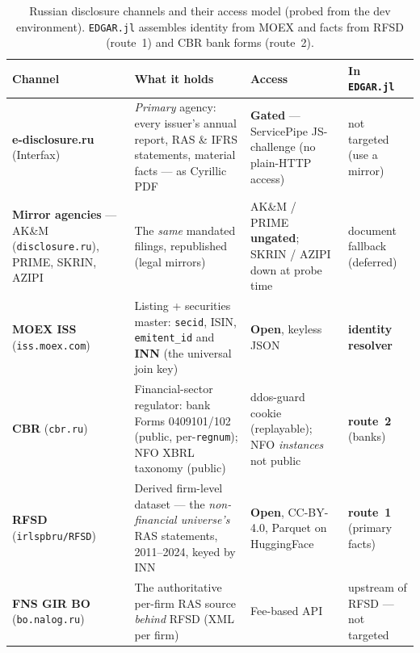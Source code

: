 \documentclass[11pt,a4paper]{report}
\begin{document}
\begin{table}[h]
\centering
\small
\caption{Russian disclosure channels and their access model (probed from the dev environment). \texttt{EDGAR.jl}
assembles identity from MOEX and facts from RFSD (route~1) and CBR bank forms (route~2).}
\label{tab:russia-repos}
\begin{tabular}{@{}p{}p{}p{}p{}@{}}
\toprule
\textbf{Channel} & \textbf{What it holds} & \textbf{Access} & \textbf{In \texttt{EDGAR.jl}} \\
\midrule
\textbf{e-disclosure.ru} (Interfax) & \emph{Primary} agency: every issuer's annual report, RAS \& IFRS
  statements, material facts --- as Cyrillic PDF & \textbf{Gated} --- ServicePipe JS-challenge (no plain-HTTP
  access) & not targeted (use a mirror) \\
\textbf{Mirror agencies} --- AK\&M (\texttt{disclosure.ru}), PRIME, SKRIN, AZIPI & The \emph{same} mandated
  filings, republished (legal mirrors) & AK\&M / PRIME \textbf{ungated}; SKRIN / AZIPI down at probe time &
  document fallback (deferred) \\
\textbf{MOEX ISS} (\texttt{iss.moex.com}) & Listing + securities master: \texttt{secid}, ISIN,
  \texttt{emitent\_id} and \textbf{INN} (the universal join key) & \textbf{Open}, keyless JSON &
  \textbf{identity resolver} \\
\textbf{CBR} (\texttt{cbr.ru}) & Financial-sector regulator: bank Forms 0409101/102 (public, per-\texttt{regnum});
  NFO XBRL taxonomy (public) & ddos-guard cookie (replayable); NFO \emph{instances} not public &
  \textbf{route~2} (banks) \\
\textbf{RFSD} (\texttt{irlspbru/RFSD}) & Derived firm-level dataset --- the \emph{non-financial universe's}
  RAS statements, 2011--2024, keyed by INN & \textbf{Open}, CC-BY-4.0, Parquet on HuggingFace &
  \textbf{route~1} (primary facts) \\
\textbf{FNS GIR BO} (\texttt{bo.nalog.ru}) & The authoritative per-firm RAS source \emph{behind} RFSD (XML per
  firm) & Fee-based API & upstream of RFSD --- not targeted \\
\bottomrule
\end{tabular}
\end{table}
\end{document}
